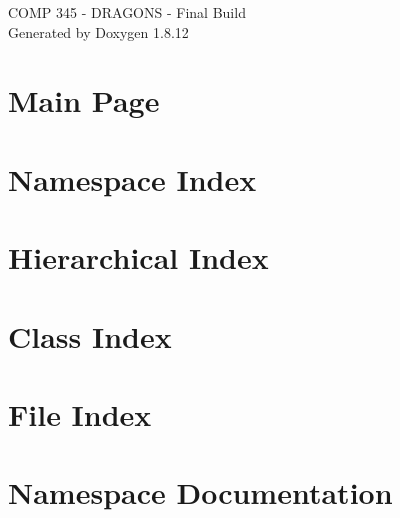 \documentclass[twoside]{book}
\newcommand{\+}{\discretionary{\mbox{\scriptsize$\hookleftarrow$}}{}{}}
\newcommand{\clearemptydoublepage}{%
  \newpage{\pagestyle{empty}\cleardoublepage}%
}
\begin{document}
\hypersetup{pageanchor=false,
             bookmarksnumbered=true,
             pdfencoding=unicode
            }
\begin{titlepage}
\vspace*{7cm}
\begin{center}%
{\Large C\+O\+MP 345 -\/ D\+R\+A\+G\+O\+NS -\/ Final Build }\\
\vspace*{1cm}
{\large Generated by Doxygen 1.8.12}\\
\end{center}
\end{titlepage}
\clearemptydoublepage
{}
\tableofcontents
\clearemptydoublepage
{}
\hypersetup{pageanchor=true}

\chapter{Main Page}
\label{index}\hypertarget{index}{}
\chapter{Namespace Index}

\chapter{Hierarchical Index}

\chapter{Class Index}

\chapter{File Index}

\chapter{Namespace Documentation}











\end{document}
